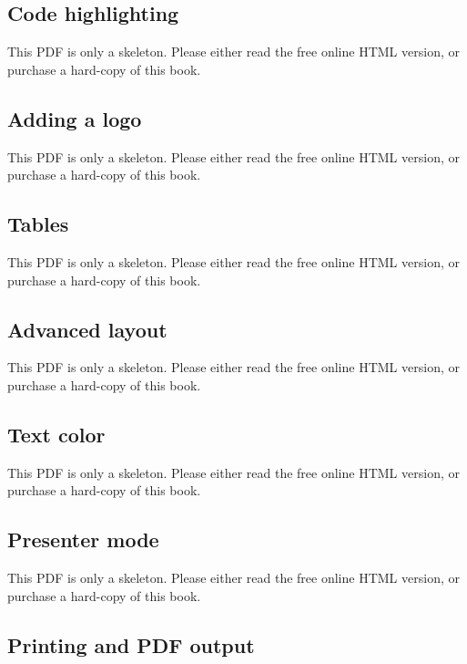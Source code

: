 \documentclass[
  11pt,
]{krantz}
\theoremstyle{definition}
\theoremstyle{definition}
\theoremstyle{definition}
\theoremstyle{definition}
\theoremstyle{remark}
\begin{document}
\subsection{Code highlighting}\label{code-highlighting}

This PDF is only a skeleton. Please either read the free online HTML version, or purchase a hard-copy of this book.

\subsection{Adding a logo}\label{adding-a-logo}

This PDF is only a skeleton. Please either read the free online HTML version, or purchase a hard-copy of this book.

\subsection{Tables}\label{tables-1}

This PDF is only a skeleton. Please either read the free online HTML version, or purchase a hard-copy of this book.

\subsection{Advanced layout}\label{advanced-layout}

This PDF is only a skeleton. Please either read the free online HTML version, or purchase a hard-copy of this book.

\subsection{Text color}\label{text-color}

This PDF is only a skeleton. Please either read the free online HTML version, or purchase a hard-copy of this book.

\subsection{Presenter mode}\label{presenter-mode}

This PDF is only a skeleton. Please either read the free online HTML version, or purchase a hard-copy of this book.

\subsection{Printing and PDF output}\label{printing-and-pdf-output}
\end{document}
